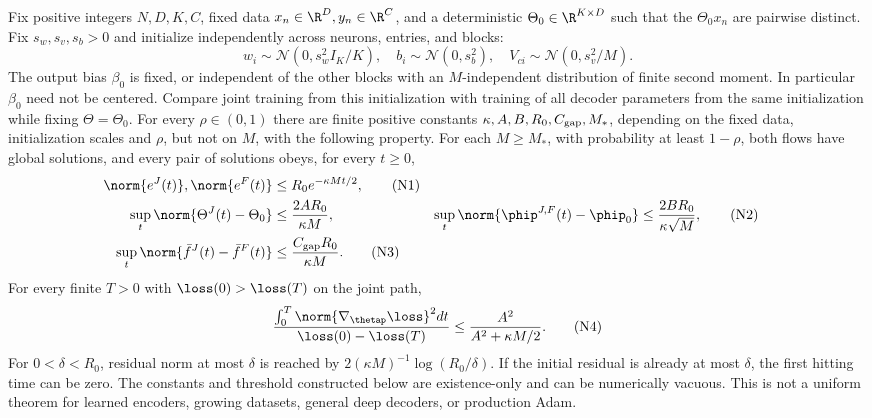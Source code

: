 \begin{theorem}
\label{thm:astra_nonlinear}
Fix positive integers $N,D,K,C$, fixed data $x_n\in\R^D,y_n\in\R^C$,
and a deterministic $\Theta_0\in\R^{K\times D}$ such that the
$\Theta_0x_n$ are pairwise distinct. Fix $s_w,s_v,s_b>0$ and initialize
independently across neurons, entries, and blocks:
\[
 w_i\sim\mathcal N(0,s_w^2 I_K/K),\quad
 b_i\sim\mathcal N(0,s_b^2),\quad
 V_{ci}\sim\mathcal N(0,s_v^2/M).
\]
The output bias $\beta_0$ is fixed, or independent of the other blocks
with an $M$-independent distribution of finite second moment. In
particular $\beta_0$ need not be centered. Compare joint training from
this initialization with training of all decoder parameters from the
same initialization while fixing $\Theta=\Theta_0$.
For every $\rho\in(0,1)$ there are finite positive constants
$\kappa,A,B,R_0,C_{\rm gap},M_*$, depending on the fixed data,
initialization scales and $\rho$, but not on $M$, with the following
property. For each $M\ge M_*$, with probability at least $1-\rho$,
both flows have global solutions, and every pair of solutions obeys,
for every $t\ge0$,
\begin{align*}
 \norm{e^J(t)},\norm{e^F(t)}
   &\le R_0e^{-\kappa Mt/2}, \tag{N1}\label{eq:astra_n1}\\
 \sup_t\norm{\Theta^J(t)-\Theta_0}
   &\le\frac{2AR_0}{\kappa M},&
 \sup_t\norm{\phip^{J,F}(t)-\phip_0}
   &\le\frac{2BR_0}{\kappa\sqrt M}, \tag{N2}\label{eq:astra_n2}\\
 \sup_t\norm{\bar f^J(t)-\bar f^F(t)}
   &\le\frac{C_{\rm gap}R_0}{\kappa M}. \tag{N3}\label{eq:astra_n3}
\end{align*}
For every finite $T>0$ with $\loss(0)>\loss(T)$ on the joint path,
\begin{equation*}
 \frac{\int_0^T\norm{\nabla_{\thetap}\loss}^2dt}
 {\loss(0)-\loss(T)}
 \le\frac{A^2}{A^2+\kappa M/2}. \tag{N4}\label{eq:astra_n4}
\end{equation*}
For $0<\delta<R_0$, residual norm at most $\delta$ is reached by
$2(\kappa M)^{-1}\log(R_0/\delta)$. If the initial residual is already
at most $\delta$, the first hitting time can be zero.
The constants and threshold constructed below are existence-only and
can be numerically vacuous. This is not a uniform theorem for learned
encoders, growing datasets, general deep decoders, or production Adam.
\end{theorem}

